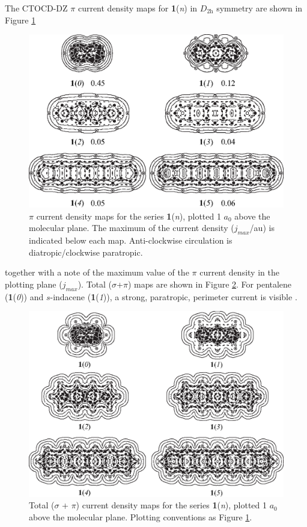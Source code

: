 The CTOCD-DZ $\pi$ current density maps for \textbf{1}(\textit{n}) in $D_\mathrm{2h}$ symmetry are shown in Figure \ref{ch7.fig01}
\begin{figure}[htp]
\center
\includegraphics{indacene/figures/figure1.eps}
\caption{$\pi$ current density maps for the series \textbf{1}(\textit{n}), plotted 1 $a_0$ above the molecular plane. The maximum of the current density ($j_{max}$/au) is indicated below each map. Anti-clockwise circulation is diatropic/clockwise paratropic.}
\label{ch7.fig01}
\end{figure}
 together with a note of the maximum value of the $\pi$ current density in the plotting plane ($j_{max}$). Total ($\sigma$+$\pi$) maps are shown in Figure \ref{ch7.fig02}. For pentalene (\textbf{1}(\textit{0})) and $s$-indacene (\textbf{1}(\textit{1})), a strong, paratropic, perimeter current is visible  \cite{r05,r14}.
\begin{figure}[hbp]
\center
\includegraphics[scale=0.8]{indacene/figures/figure2.eps}
\caption{Total ($\sigma$ + $\pi$) current density maps for the series \textbf{1}(\textit{n}), plotted 1 $a_0$ above the molecular plane. Plotting conventions as Figure \ref{ch7.fig01}.}
\label{ch7.fig02}
\end{figure}
